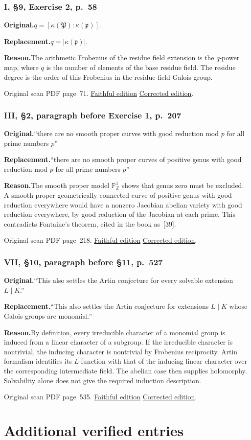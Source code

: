 \documentclass[11pt,a4paper]{article}
\newcommand{\original}{\par\smallskip\noindent\textbf{Original.}\enspace}
\newcommand{\replacement}{\par\smallskip\noindent\textbf{Replacement.}\enspace}
\newcommand{\reason}{\par\smallskip\noindent\textbf{Reason.}\enspace}
\newcommand{\editionlink}[3]{\href{#1\#errata.#2}{#3}}
\newcommand{\location}[2]{%
  \par\smallskip\noindent Original scan PDF page~#2.\enspace
  \editionlink{Neukirch_Faithful.pdf}{#1}{Faithful edition}
  \quad\editionlink{Neukirch_Corrected.pdf}{#1}{Corrected edition}.}
\begin{document}
\setcounter{section}{2}
\section{I, \S9, Exercise 2, p.~58}\label{errata:item:3}
\original $q=[\kappa(\mathfrak P):\kappa(\mathfrak p)]$.
\replacement $q=|\kappa(\mathfrak p)|$.
\reason The arithmetic Frobenius of the residue field extension is the $q$-power map, where $q$ is the number of elements of the base residue field. The residue degree is the order of this Frobenius in the residue-field Galois group.
\location{3}{71}

\setcounter{section}{3}
\section{III, \S2, paragraph before Exercise 1, p.~207}\label{errata:item:4}
\original ``there are no smooth proper curves with good reduction mod $p$ for all prime numbers $p$''
\replacement ``there are no smooth proper curves of positive genus with good reduction mod $p$ for all prime numbers $p$''
\reason The smooth proper model $\mathbb P^1_{\mathbb Z}$ shows that genus zero must be excluded. A smooth proper geometrically connected curve of positive genus with good reduction everywhere would have a nonzero Jacobian abelian variety with good reduction everywhere, by good reduction of the Jacobian at each prime. This contradicts Fontaine's theorem, cited in the book as~[39].
\location{4}{218}

\setcounter{section}{4}
\section{VII, \S10, paragraph before \S11, p.~527}\label{errata:item:5}
\original ``This also settles the Artin conjecture for every solvable extension $L\mid K$.''
\replacement ``This also settles the Artin conjecture for extensions $L\mid K$ whose Galois groups are monomial.''
\reason By definition, every irreducible character of a monomial group is induced from a linear character of a subgroup. If the irreducible character is nontrivial, the inducing character is nontrivial by Frobenius reciprocity. Artin formalism identifies its $L$-function with that of the inducing linear character over the corresponding intermediate field. The abelian case then supplies holomorphy. Solvability alone does not give the required induction description.
\location{5}{535}

\part{Additional verified entries}
\setcounter{section}{5}
\end{document}
